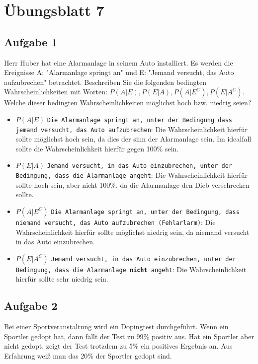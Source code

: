 \chapter{Übungsblatt 7}

\section{Aufgabe 1}

Herr Huber hat eine Alarmanlage in seinem Auto installiert. Es werden die
Ereignisse A: "Alarmanlage springt an" und E: "Jemand versucht, das Auto
aufzubrechen" betrachtet. Beschreiben Sie die folgenden bedingten
Wahrscheinlichkeiten mit Worten: $P(A|E), P(E|A), P(A|E^C), P(E|A^C)$. Welche
dieser bedingten Wahrscheinlichkeiten möglichst hoch bzw. niedrig seien?

\begin{itemize}
    \item $P(A|E)$ \texttt{Die Alarmanlage springt an, unter der Bedingung dass jemand versucht, das Auto aufzubrechen}: Die Wahrscheinlichkeit hierfür sollte möglichst hoch sein, da dies der sinn der Alarmanlage sein. Im idealfall sollte die Wahrscheinlichkeit hierfür gegen 100\% sein.
    \item $P(E|A)$ \texttt{Jemand versucht, in das Auto einzubrechen, unter der Bedingung, dass die Alarmanlage angeht}: Die Wahrscheinlichkeit hierfür sollte hoch sein, aber nicht 100\%, da die Alarmanlage den Dieb verschrecken sollte.
    \item $P(A|E^C)$ \texttt{Die Alarmanlage springt an, unter der Bedingung, dass niemand versucht, das Auto aufzubrechen (Fehlarlarm)}: Die Wahrscheinlichkeit hierfür sollte möglichst niedrig sein, da niemand versucht in das Auto einzubrechen.
    \item $P(E|A^C)$ \texttt{Jemand versucht, in das Auto einzubrechen, unter der Bedingung, dass die Alarmanlage \textbf{nicht} angeht}: Die Wahrscheinlichkeit hierfür sollte sehr niedrig sein.
\end{itemize}

\section{Aufgabe 2}

Bei einer Sportveranstaltung wird ein Dopingtest durchgeführt. Wenn ein
Sportler gedopt hat, dann fällt der Test zu 99\% positiv aus. Hat ein Sportler
aber nicht gedopt, zeigt der Test trotzdem zu 5\% ein positives Ergebnis an.
Aus Erfahrung weiß man das 20\% der Sportler gedopt sind.

